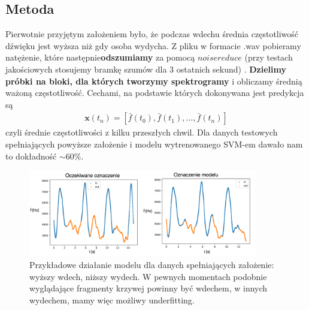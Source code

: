 \documentclass[polish]{article}
\begin{document}
\subsection{Metoda}
Pierwotnie przyjętym założeniem było, że podczas wdechu średnia częstotliwość dźwięku jest wyższa niż
gdy osoba wydycha. Z pliku w formacie .wav pobieramy natężenie, które następnie\textbf{odszumiamy} za pomocą $noisereduce$ (przy testach jakościowych stosujemy bramkę szumów dla 3 ostatnich sekund) . 
\textbf{Dzielimy próbki na bloki, dla których tworzymy spektrogramy} i obliczamy
średnią ważoną częstotliwość.
Cechami, na podstawie których dokonywana jest predykcja są  
\begin{gather*}
\boldsymbol x (t_n) = [\bar{f}(t_0), \bar{f}(t_1), ..., \bar{f}(t_n)]
\end{gather*}
czyli średnie częstotliwości z kilku przeszłych chwil.
Dla danych testowych spełniających powyższe założenie i modelu wytrenowanego SVM-em dawało nam to dokładność $\sim 60\%$.
\begin{figure}[H]
	\centering
	\includegraphics[width=10cm]{porownanie_srednie}
	\caption{Przykładowe działanie modelu dla danych spełniających założenie: wyższy wdech, niższy wydech.
	W pewnych momentach podobnie wyglądające fragmenty krzywej powinny być wdechem, w innych wydechem, mamy więc możliwy underfitting.}
\end{figure}
\end{document}
